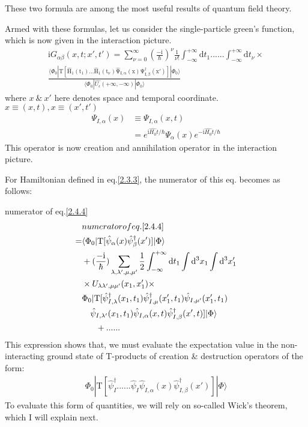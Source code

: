 These two formula are among the most useful results of quantum field theory.


Armed with these formulas, let us consider the  single-particle green's function, which is now given in the interaction picture.
\begin{align}\label{2.4.4}
\mathrm{i}G_{\alpha\beta}(x,t;x',t')=\sum_{\nu=0}^{\infty}(\frac{-\mathrm{i}}{\hbar})^{\nu} \frac{1}{\nu!} \int_{-\infty}^{+\infty}\mathrm{d}t_1......\int_{-\infty}^{+\infty}\mathrm{d}t_{\nu}\times\nonumber  \\
\frac{\langle\Phi_0|\mathrm{T[\hat H_1(t_1)...\hat H_1(t_{\nu})\hat \Psi_{I,\alpha}(x)\Psi^{\dagger}_{I,\beta}(x')]}
|\Phi_0\rangle}{\langle\Phi_0|\hat{U_{\epsilon}}(+\infty,-\infty)|\Phi_0\rangle}
\end{align}
where $x\ \&\ x'$ here denotes space and temporal coordinate.$x\equiv(x,t),x\equiv (x',t')$
\begin{align}
\Psi_{I,\alpha}(x)&\equiv\Psi_{I,\alpha}(x,t) \nonumber \\
&=e^{\mathrm{i}\hat{H_0}t/\hbar}\Psi_{\alpha}(x)e^{-\mathrm{i}\hat{H_0}t/\hbar} \nonumber
\end{align}
This operator is now creation and annihilation operator in the interaction picture.

For Hamiltonian defined in eq.\ref{2.3.3}, the numerator of this eq. becomes as follows:

numerator of eq.\ref{2.4.4}
\begin{align}\label{2.4.5}
& numerator of eq.\ref{2.4.4} \nonumber \\
=&\langle \Phi_0|\mathrm{T}[\hat \psi_{\alpha }(x)\hat \psi_{\beta }^{\dagger}(x')]|\Phi\rangle \nonumber \\
&+(\frac{-\mathrm{i}}{\hbar})\sum_{\lambda,\lambda',\mu,\mu'}\frac{1}{2}\int_{-\infty}^{+\infty}\mathrm{d}t_1\int\mathrm{d}^3x_1\int\mathrm{d}^3x_1' \nonumber \\
&\times U_{\lambda\lambda',\mu\mu'}(x_1,x_1')\times \nonumber\\
&\Phi_0|\mathrm{T}[\hat \psi_{I,\lambda}^{\dagger}(x_1,t_1)\hat \psi_{I,\mu}^{\dagger}(x_1',t_1)\hat \psi_{I,\mu' }(x_1',t_1) \nonumber \\
&\ \ \ \hat \psi_{I,\lambda' }(x_1,t_1)\hat \psi_{I,\alpha}(x,t)\hat \psi^{\dagger}_{I,\beta }(x',t)]|\Phi\rangle \nonumber \\
&\ \ \ \ \ +......
\end{align}
This expression shows that, we must evaluate the expectation value in the non-interacting ground state of T-products of creation \& destruction operators of the form:
\begin{align}
\Phi_0|\mathrm{T}[\hat \psi_{I}^{\dagger}......\hat \psi_{I}\hat \psi_{I,\alpha}(x)\hat \psi^{\dagger}_{I,\beta }(x')]|\Phi\rangle \nonumber 
\end{align}
To evaluate this form of quantities, we will rely on so-called Wick's theorem, which I will explain next.

